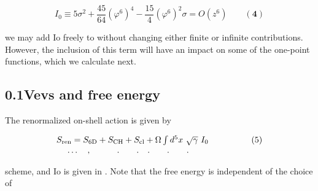 \documentclass{article}
\begin{document}
\begin{equation}
I _ { 0 } \equiv 5 \sigma ^ { 2 } + \frac { 4 5 } { 6 4 } ( \varphi ^ { 6 } ) ^ { 4 } - \frac { 1 5 } { 4 } ( \varphi ^ { 6 } ) ^ { 2 } \sigma = O ( z ^ { 6 } ) \qquad ( \mathbf { 4 } )
\end{equation}


we may add Io freely to without changing either finite or infinite contributions. However,
the inclusion of this term will have an impact on some of the one-point functions, which we
calculate next.


\subsection*{0.1Vevs and free energy}


The renormalized on-shell action is given by


\begin{equation}
\begin{array} { c c c } { S _ { \mathrm { r e n } } = S _ { \mathrm { 6 D } } + S _ { \mathrm { C H } } + S _ { \mathrm { c l } } + \Omega \int d ^ { 5 } x ~ \sqrt { \gamma } ~ I _ { 0 } } & { \qquad \qquad ( 5 ) } \\ { \dots \quad, \quad \quad \quad. \quad \quad. \quad. \quad \quad. \quad \quad. \quad } \end{array}
\end{equation}


scheme, and Io is given in . Note that the free energy is independent of the choice of
\end{document}
